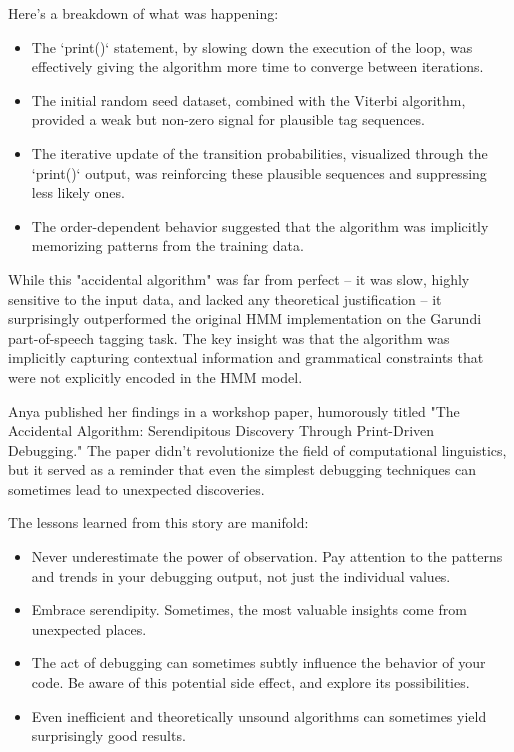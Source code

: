 \documentclass{article}
\begin{document}
{{{{Here's a breakdown of what was happening:

\begin{itemize}
    \item The `print()` statement, by slowing down the execution of the loop, was effectively giving the algorithm more time to converge between iterations.
    \item The initial random seed dataset, combined with the Viterbi algorithm, provided a weak but non-zero signal for plausible tag sequences.
    \item The iterative update of the transition probabilities, visualized through the `print()` output, was reinforcing these plausible sequences and suppressing less likely ones.
    \item The order-dependent behavior suggested that the algorithm was implicitly memorizing patterns from the training data.
\end{itemize}

While this "accidental algorithm" was far from perfect – it was slow, highly sensitive to the input data, and lacked any theoretical justification – it surprisingly outperformed the original HMM implementation on the Garundi part-of-speech tagging task. The key insight was that the algorithm was implicitly capturing contextual information and grammatical constraints that were not explicitly encoded in the HMM model.

Anya published her findings in a workshop paper, humorously titled "The Accidental Algorithm: Serendipitous Discovery Through Print-Driven Debugging." The paper didn't revolutionize the field of computational linguistics, but it served as a reminder that even the simplest debugging techniques can sometimes lead to unexpected discoveries.

The lessons learned from this story are manifold:

\begin{itemize}
    \item Never underestimate the power of observation. Pay attention to the patterns and trends in your debugging output, not just the individual values.
    \item Embrace serendipity. Sometimes, the most valuable insights come from unexpected places.
    \item The act of debugging can sometimes subtly influence the behavior of your code. Be aware of this potential side effect, and explore its possibilities.
    \item Even inefficient and theoretically unsound algorithms can sometimes yield surprisingly good results.
\end{itemize}

}}}}
\end{document}
